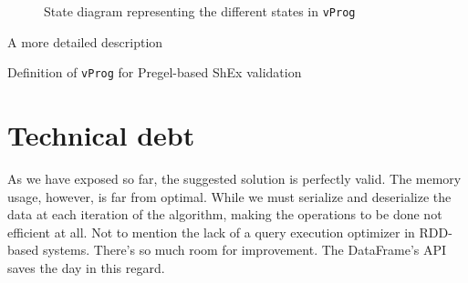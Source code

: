 \begin{figure}[H]
    \centering
    
    \caption[State diagram representing the different states in \texttt{vProg}]{State diagram representing the different states in \texttt{vProg}~\cite{https://doi.org/10.48550/arxiv.2110.11709}}
    \label{fig:state:pregel}
\end{figure}

A more detailed description

\begin{center}
    
\end{center}

\begin{pseudocode}
    
\end{pseudocode}

\begin{table}
    \centering
    
    \label{vProg}
    \caption{Definition of \texttt{vProg} for Pregel-based ShEx validation}
\end{table}
\section{Technical debt}

As we have exposed so far, the suggested solution is perfectly valid. The memory usage, however, is far from optimal. While we must serialize and deserialize the data at each iteration of the algorithm, making the operations to be done not efficient at all. Not to mention the lack of a query execution optimizer in RDD-based systems. There's so much room for improvement. The DataFrame's API saves the day in this regard.